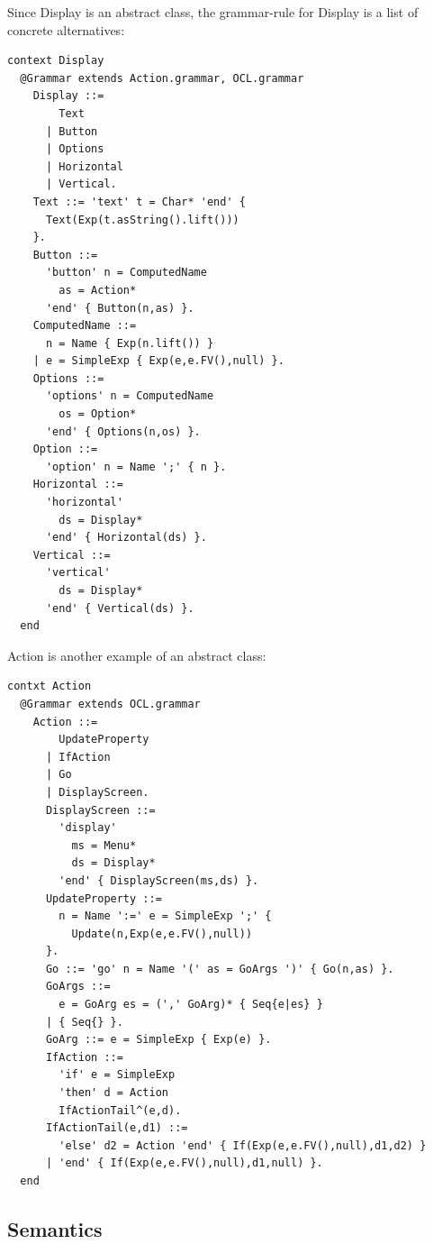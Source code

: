 Since Display is an abstract class, the grammar-rule for Display is
a list of concrete alternatives:

\begin{lstlisting}
context Display
  @Grammar extends Action.grammar, OCL.grammar
    Display ::=
        Text
      | Button
      | Options
      | Horizontal
      | Vertical.
    Text ::= 'text' t = Char* 'end' { 
      Text(Exp(t.asString().lift())) 
    }.
    Button ::= 
      'button' n = ComputedName 
        as = Action* 
      'end' { Button(n,as) }.
    ComputedName ::=
      n = Name { Exp(n.lift()) }
    | e = SimpleExp { Exp(e,e.FV(),null) }.
    Options ::= 
      'options' n = ComputedName 
        os = Option* 
      'end' { Options(n,os) }.
    Option ::=
      'option' n = Name ';' { n }.
    Horizontal ::=
      'horizontal'
        ds = Display*
      'end' { Horizontal(ds) }.
    Vertical ::=
      'vertical'
        ds = Display*
      'end' { Vertical(ds) }.
  end
\end{lstlisting}\newpage{}

Action is another example of an abstract class:

\begin{lstlisting}
contxt Action
  @Grammar extends OCL.grammar
    Action ::=
        UpdateProperty
      | IfAction
      | Go
      | DisplayScreen.
      DisplayScreen ::= 
        'display' 
          ms = Menu* 
          ds = Display* 
        'end' { DisplayScreen(ms,ds) }.
      UpdateProperty ::=
        n = Name ':=' e = SimpleExp ';' {
          Update(n,Exp(e,e.FV(),null))  
      }.
      Go ::= 'go' n = Name '(' as = GoArgs ')' { Go(n,as) }.
      GoArgs ::= 
        e = GoArg es = (',' GoArg)* { Seq{e|es} }
      | { Seq{} }.
      GoArg ::= e = SimpleExp { Exp(e) }.
      IfAction ::=
        'if' e = SimpleExp
        'then' d = Action
        IfActionTail^(e,d).
      IfActionTail(e,d1) ::=
        'else' d2 = Action 'end' { If(Exp(e,e.FV(),null),d1,d2) }
      | 'end' { If(Exp(e,e.FV(),null),d1,null) }. 
  end
\end{lstlisting}
\subsection{Semantics}

